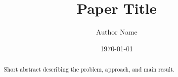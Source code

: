 \documentclass{model-paper}
\title{Paper Title}
\author{Author Name}
\affiliation{Model Research}
\date{\today}
\begin{document}
\maketitle

\begin{abstract}
Short abstract describing the problem, approach, and main result.
\end{abstract}








\end{document}
